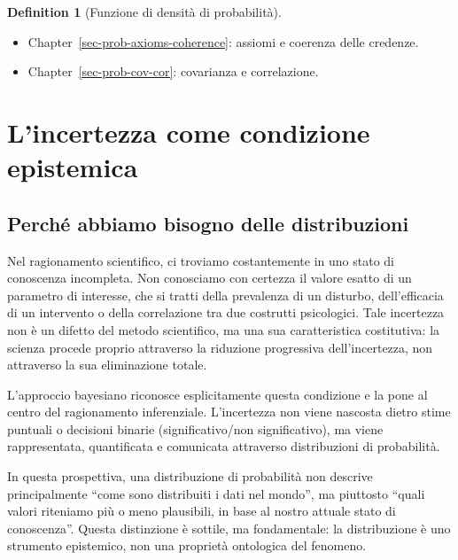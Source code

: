 \documentclass[
  letterpaper,
  DIV=11,
  numbers=noendperiod,
  oneside]{scrreprt}
\providecommand{\tightlist}{%
  \setlength{\itemsep}{0pt}\setlength{\parskip}{0pt}}
\theoremstyle{definition}
\theoremstyle{plain}
\theoremstyle{definition}
\newtheorem{definition}{Definition}[chapter]
\theoremstyle{remark}
\begin{document}
\begin{definition}[Funzione di densità di
probabilità]
\begin{tcolorbox}[enhanced jigsaw, arc=.35mm, breakable, colbacktitle=quarto-callout-tip-color!10!white, opacityback=0, toprule=.15mm, rightrule=.15mm, colback=white, opacitybacktitle=0.6, leftrule=.75mm, coltitle=black, bottomtitle=1mm, left=2mm, toptitle=1mm, title=\textcolor{quarto-callout-tip-color}{\faLightbulb}\hspace{0.5em}{Prerequisiti}, titlerule=0mm, bottomrule=.15mm, colframe=quarto-callout-tip-color-frame]

\begin{itemize}
\tightlist
\item
  Chapter~\ref{sec-prob-axioms-coherence}: assiomi e coerenza delle
  credenze.
\item
  Chapter~\ref{sec-prob-cov-cor}: covarianza e correlazione.
\end{itemize}

\end{tcolorbox}

\section{L'incertezza come condizione
epistemica}\label{lincertezza-come-condizione-epistemica}

\subsection{Perché abbiamo bisogno delle
distribuzioni}\label{perchuxe9-abbiamo-bisogno-delle-distribuzioni}

Nel ragionamento scientifico, ci troviamo costantemente in uno stato di
conoscenza incompleta. Non conosciamo con certezza il valore esatto di
un parametro di interesse, che si tratti della prevalenza di un
disturbo, dell'efficacia di un intervento o della correlazione tra due
costrutti psicologici. Tale incertezza non è un difetto del metodo
scientifico, ma una sua caratteristica costitutiva: la scienza procede
proprio attraverso la riduzione progressiva dell'incertezza, non
attraverso la sua eliminazione totale.

L'approccio bayesiano riconosce esplicitamente questa condizione e la
pone al centro del ragionamento inferenziale. L'incertezza non viene
nascosta dietro stime puntuali o decisioni binarie (significativo/non
significativo), ma viene rappresentata, quantificata e comunicata
attraverso distribuzioni di probabilità.

In questa prospettiva, una distribuzione di probabilità non descrive
principalmente ``come sono distribuiti i dati nel mondo'', ma piuttosto
``quali valori riteniamo più o meno plausibili, in base al nostro
attuale stato di conoscenza''. Questa distinzione è sottile, ma
fondamentale: la distribuzione è uno strumento epistemico, non una
proprietà ontologica del fenomeno.


\end{definition}
\end{document}
